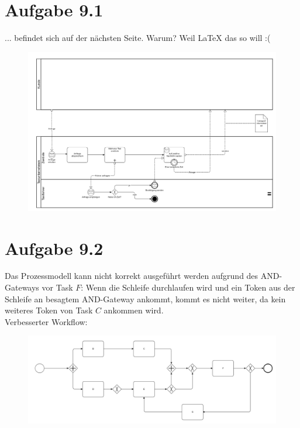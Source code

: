 \documentclass{article}
\begin{document}
	 
	 
	 \section*{Aufgabe 9.1}
	 ... befindet sich auf der nächsten Seite. Warum? Weil LaTeX das so will :(
	 	\begin{landscape}
	 		\begin{figure}[h!]
	 			\includegraphics[scale=0.14]{aufgabe_9_1.jpg}
	 		\end{figure}
	 	\end{landscape}
	
	
	\section*{Aufgabe 9.2}
	Das Prozessmodell kann nicht korrekt ausgeführt werden aufgrund des AND-Gateways vor Task $ F $: Wenn die Schleife durchlaufen wird und ein Token aus der Schleife an besagtem AND-Gateway ankommt, kommt es nicht weiter, da kein weiteres Token von Task $ C $ ankommen wird.\\[2em]
	Verbesserter Workflow:
	\begin{figure}[h!]
		\includegraphics[scale=0.12]{aufgabe_9_2.jpg}
	\end{figure}
	
\end{document}
